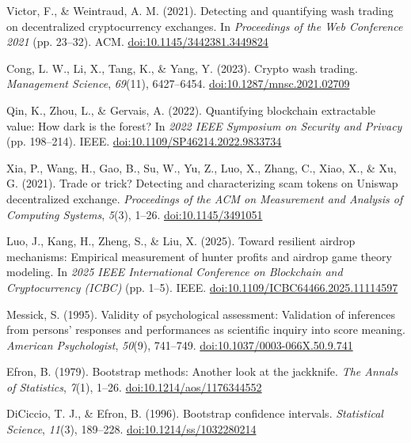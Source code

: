 \begin{enumerate}[label={[\arabic*]}, leftmargin=*, itemsep=0.35em, parsep=0pt]
  \item{}\label{ref:28} Victor, F., \& Weintraud, A. M. (2021). Detecting and quantifying wash trading on decentralized cryptocurrency exchanges. In \textit{Proceedings of the Web Conference 2021} (pp. 23--32). ACM. \href{https://doi.org/10.1145/3442381.3449824}{doi:10.1145/3442381.3449824}
  \item{}\label{ref:29} Cong, L. W., Li, X., Tang, K., \& Yang, Y. (2023). Crypto wash trading. \textit{Management Science}, \textit{69}(11), 6427--6454. \href{https://doi.org/10.1287/mnsc.2021.02709}{doi:10.1287/mnsc.2021.02709}
  \item{}\label{ref:30} Qin, K., Zhou, L., \& Gervais, A. (2022). Quantifying blockchain extractable value: How dark is the forest? In \textit{2022 IEEE Symposium on Security and Privacy} (pp. 198--214). IEEE. \href{https://doi.org/10.1109/SP46214.2022.9833734}{doi:10.1109/SP46214.2022.9833734}
  \item{}\label{ref:31} Xia, P., Wang, H., Gao, B., Su, W., Yu, Z., Luo, X., Zhang, C., Xiao, X., \& Xu, G. (2021). Trade or trick? Detecting and characterizing scam tokens on Uniswap decentralized exchange. \textit{Proceedings of the ACM on Measurement and Analysis of Computing Systems}, \textit{5}(3), 1--26. \href{https://doi.org/10.1145/3491051}{doi:10.1145/3491051}
  \item{}\label{ref:32} Luo, J., Kang, H., Zheng, S., \& Liu, X. (2025). Toward resilient airdrop mechanisms: Empirical measurement of hunter profits and airdrop game theory modeling. In \textit{2025 IEEE International Conference on Blockchain and Cryptocurrency (ICBC)} (pp. 1--5). IEEE. \href{https://doi.org/10.1109/ICBC64466.2025.11114597}{doi:10.1109/ICBC64466.2025.11114597}
  \item{}\label{ref:33} Messick, S. (1995). Validity of psychological assessment: Validation of inferences from persons' responses and performances as scientific inquiry into score meaning. \textit{American Psychologist}, \textit{50}(9), 741--749. \href{https://doi.org/10.1037/0003-066X.50.9.741}{doi:10.1037/0003-066X.50.9.741}
  \item{}\label{ref:34} Efron, B. (1979). Bootstrap methods: Another look at the jackknife. \textit{The Annals of Statistics}, \textit{7}(1), 1--26. \href{https://doi.org/10.1214/aos/1176344552}{doi:10.1214/aos/1176344552}
  \item{}\label{ref:35} DiCiccio, T. J., \& Efron, B. (1996). Bootstrap confidence intervals. \textit{Statistical Science}, \textit{11}(3), 189--228. \href{https://doi.org/10.1214/ss/1032280214}{doi:10.1214/ss/1032280214}

\end{enumerate}
